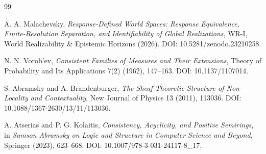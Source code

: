 \documentclass[11pt]{article}
\begin{document}
\begin{thebibliography}{99}

A. A. Malachevsky,
\emph{Response-Defined World Spaces: Response Equivalence,
Finite-Resolution Separation, and Identifiability of Global Realizations},
WR-I, World Realizability \& Epistemic Horizons (2026).
DOI: 10.5281/zenodo.23210258.

N. N. Vorob'ev,
\emph{Consistent Families of Measures and Their Extensions},
Theory of Probability and Its Applications 7(2) (1962), 147--163.
DOI: 10.1137/1107014.

S. Abramsky and A. Brandenburger,
\emph{The Sheaf-Theoretic Structure of Non-Locality and Contextuality},
New Journal of Physics 13 (2011), 113036.
DOI: 10.1088/1367-2630/13/11/113036.

A. Atserias and P. G. Kolaitis,
\emph{Consistency, Acyclicity, and Positive Semirings},
in \emph{Samson Abramsky on Logic and Structure in Computer Science and Beyond},
Springer (2023), 623--668.
DOI: 10.1007/978-3-031-24117-8\_17.

\end{thebibliography}
\end{document}
